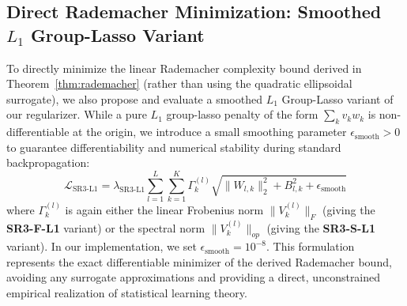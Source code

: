 \subsection{Direct Rademacher Minimization: Smoothed $L_1$ Group-Lasso Variant}
To directly minimize the linear Rademacher complexity bound derived in Theorem~\ref{thm:rademacher} (rather than using the quadratic ellipsoidal surrogate), we also propose and evaluate a smoothed $L_1$ Group-Lasso variant of our regularizer. While a pure $L_1$ group-lasso penalty of the form $\sum_k v_k w_k$ is non-differentiable at the origin, we introduce a small smoothing parameter $\epsilon_{\text{smooth}} > 0$ to guarantee differentiability and numerical stability during standard backpropagation:
\begin{equation}
    \mathcal{L}_{\text{SR3-L1}} = \lambda_{\text{SR3-L1}} \sum_{l=1}^L \sum_{k=1}^K \Gamma_k^{(l)} \sqrt{\|W_{l, k}\|_2^2 + B_{l, k}^2 + \epsilon_{\text{smooth}}}
\end{equation}
where $\Gamma_k^{(l)}$ is again either the linear Frobenius norm $\|V_k^{(l)}\|_F$ (giving the \textbf{SR3-F-L1} variant) or the spectral norm $\|V_k^{(l)}\|_{op}$ (giving the \textbf{SR3-S-L1} variant). In our implementation, we set $\epsilon_{\text{smooth}} = 10^{-8}$. This formulation represents the exact differentiable minimizer of the derived Rademacher bound, avoiding any surrogate approximations and providing a direct, unconstrained empirical realization of statistical learning theory.

